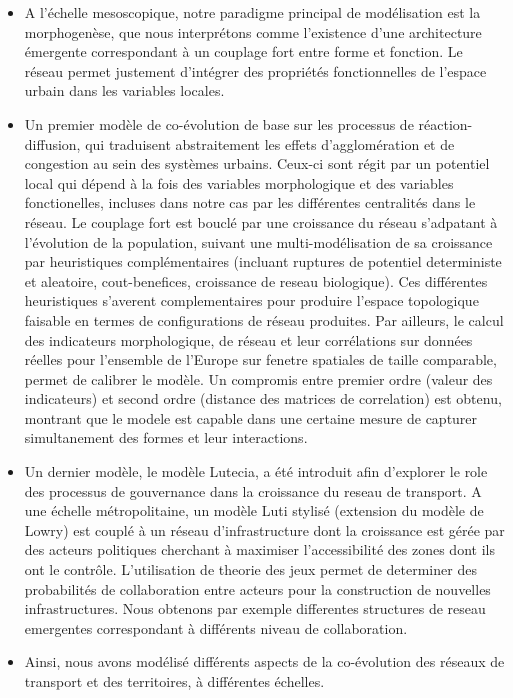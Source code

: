 \documentclass[11pt]{article}
\begin{document}


\begin{itemize}
	\item A l'échelle mesoscopique, notre paradigme principal de modélisation est la morphogenèse, que nous interprétons comme l'existence d'une architecture émergente correspondant à un couplage fort entre forme et fonction. Le réseau permet justement d'intégrer des propriétés fonctionnelles de l'espace urbain dans les variables locales.
	\item Un premier modèle de co-évolution de base sur les processus de réaction-diffusion, qui traduisent abstraitement les effets d'agglomération et de congestion au sein des systèmes urbains. Ceux-ci sont régit par un potentiel local qui dépend à la fois des variables morphologique et des variables fonctionelles, incluses dans notre cas par les différentes centralités dans le réseau. Le couplage fort est bouclé par une croissance du réseau s'adpatant à l'évolution de la population, suivant une multi-modélisation de sa croissance par heuristiques complémentaires (incluant ruptures de potentiel deterministe et aleatoire, cout-benefices, croissance de reseau biologique). Ces différentes heuristiques s'averent complementaires pour produire l'espace topologique faisable en termes de configurations de réseau produites. Par ailleurs, le calcul des indicateurs morphologique, de réseau et leur corrélations sur données réelles pour l'ensemble de l'Europe sur fenetre spatiales de taille comparable, permet de calibrer le modèle. Un compromis entre premier ordre (valeur des indicateurs) et second ordre (distance des matrices de correlation) est obtenu, montrant que le modele est capable dans une certaine mesure de capturer simultanement des formes et leur interactions.
	\item Un dernier modèle, le modèle Lutecia, a été introduit afin d'explorer le role des processus de gouvernance dans la croissance du reseau de transport. A une échelle métropolitaine, un modèle Luti stylisé (extension du modèle de Lowry) est couplé à un réseau d'infrastructure dont la croissance est gérée par des acteurs politiques cherchant à maximiser l'accessibilité des zones dont ils ont le contrôle. L'utilisation de theorie des jeux permet de determiner des probabilités de collaboration entre acteurs pour la construction de nouvelles infrastructures. Nous obtenons par exemple differentes structures de reseau emergentes correspondant à différents niveau de collaboration.
	\item Ainsi, nous avons modélisé différents aspects de la co-évolution des réseaux de transport et des territoires, à différentes échelles.
\end{itemize}
\end{document}

